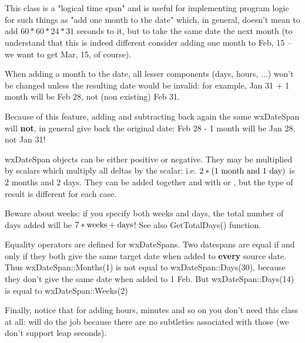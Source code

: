 
\section{}\label{wxdatespan}

This class is a "logical time span" and is useful for implementing program
logic for such things as "add one month to the date" which, in general,
doesn't mean to add $60*60*24*31$ seconds to it, but to take the same date
the next month (to understand that this is indeed different consider adding
one month to Feb, 15 -- we want to get Mar, 15, of course).

When adding a month to the date, all lesser components (days, hours, ...)
won't be changed unless the resulting date would be invalid: for example,
Jan 31 + 1 month will be Feb 28, not (non existing) Feb 31.

Because of this feature, adding and subtracting back again the same
wxDateSpan will {\bf not}, in general give back the original date: Feb 28 - 1
month will be Jan 28, not Jan 31!

wxDateSpan objects can be either positive or negative. They may be
multiplied by scalars which multiply all deltas by the scalar: i.e.
$2*(1 \hbox{ month and } 1 \hbox{ day})$ is $2$ months and $2$ days. They can
be added together and with  or 
, but the type of result is different for each
case.

Beware about weeks: if you specify both weeks and days, the total number of
days added will be $7*\hbox{weeks} + \hbox{days}$! See also GetTotalDays()
function.

Equality operators are defined for wxDateSpans. Two datespans are equal if
and only if they both give the same target date when added to {\bf every}\rtfsp
source date. Thus wxDateSpan::Months(1) is not equal to wxDateSpan::Days(30),
because they don't give the same date when added to 1 Feb. But
wxDateSpan::Days(14) is equal to wxDateSpan::Weeks(2)

Finally, notice that for adding hours, minutes and so on you don't need this
class at all:  will do the job because there
are no subtleties associated with those (we don't support leap seconds).

